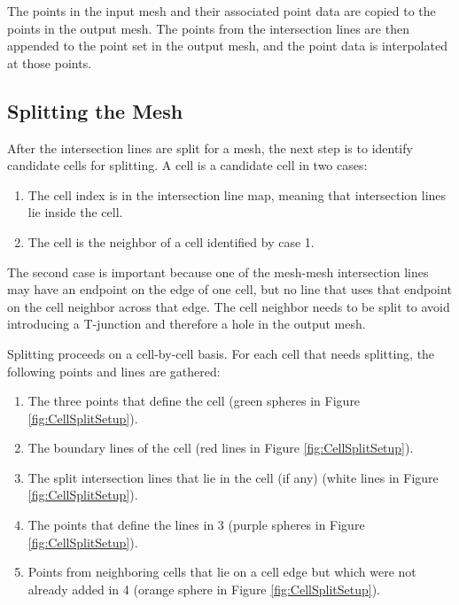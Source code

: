 \documentclass{InsightArticle}
\begin{document}
The points in the input mesh and their associated point data are copied to the points in the output mesh. The points from the intersection lines are then appended to the point set in the output mesh, and the point data is interpolated at those points. 

\subsection{Splitting the Mesh}

After the intersection lines are split for a mesh, the next step is to identify candidate cells for splitting. A cell is a candidate cell in two cases:

\begin{enumerate}
\item The cell index is in the intersection line map, meaning that intersection lines lie inside the cell.
\item The cell is the neighbor of a cell identified by case 1.
\end{enumerate}

The second case is important because one of the mesh-mesh intersection lines may have an endpoint on the edge of one cell, but no line that uses that endpoint on the cell neighbor across that edge. The cell neighbor needs to be split to avoid introducing a T-junction and therefore a hole in the output mesh.

Splitting proceeds on a cell-by-cell basis. For each cell that needs splitting, the following points and lines are gathered:

\begin{enumerate}
\item The three points that define the cell (green spheres in Figure \ref{fig:CellSplitSetup}).
\item The boundary lines of the cell (red lines in Figure \ref{fig:CellSplitSetup}).
\item The split intersection lines that lie in the cell (if any) (white lines in Figure \ref{fig:CellSplitSetup}).
\item The points that define the lines in 3 (purple spheres in Figure \ref{fig:CellSplitSetup}).
\item Points from neighboring cells that lie on a cell edge but which were not already added in 4 (orange sphere in Figure \ref{fig:CellSplitSetup}).
\end{enumerate}
\end{document}
